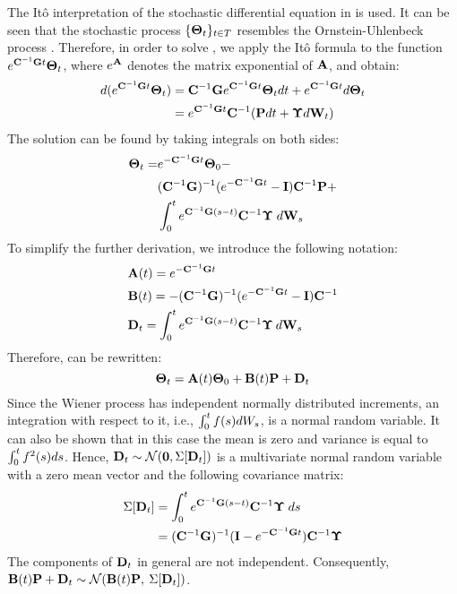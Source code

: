 The It\^{o} interpretation \cite{oksendal2003} of the stochastic differential equation in  is used. It can be seen that the stochastic process $\{ \mathbf{\Theta}_t \}_{t \in T}$ resembles the Ornstein-Uhlenbeck process \cite{kloeden1992}. Therefore, in order to solve , we apply the It\^{o} formula \cite{oksendal2003} to the function $e^{ \mathbf{C}^{-1} \mathbf{G} t} \mathbf{\Theta}_t$, where $e^{\mathbf{A}}$ denotes the matrix exponential of $\mathbf{A}$, and obtain:
\begin{align*}
  d(e^{\mathbf{C}^{-1} \mathbf{G} t} \mathbf{\Theta}_t) & = \mathbf{C}^{-1} \mathbf{G} e^{\mathbf{C}^{-1} \mathbf{G} t} \mathbf{\Theta}_t dt + e^{\mathbf{C}^{-1} \mathbf{G} t} d\mathbf{\Theta}_t \\
  & = e^{\mathbf{C}^{-1} \mathbf{G} t} \mathbf{C}^{-1} (\mathbf{P} dt + \mathbf{\Upsilon} d\mathbf{W}_t)
\end{align*}
The solution can be found by taking integrals on both sides:
\begin{align} \equlabel{solution-full}
  \vtemperature_\time = & \emcgt \vtemperature_0 - \\
    & (\cg)^{-1}(\emcgt - \mone) \mcapacitance^{-1} \vpower + \nonumber \\
    & \int_0^\time \ecg{}{(s - \time)} \mcapacitance^{-1} \mnoisedeviation \; d\m{W}_s \nonumber
\end{align}
To simplify the further derivation, we introduce the following notation:
\begin{align}
  & \m{A}(\time) = \emcg{\time} \equlabel{a} \\
  & \m{B}(\time) = -(\cg)^{-1}(\emcg{\time} - \mone) \mcapacitance^{-1} \equlabel{b} \\
  & \v{D}_\time = \int_0^{\time} \ecg{}{(s - \time)} \mcapacitance^{-1} \mnoisedeviation \: d\m{W}_s \equlabel{d}
\end{align}
Therefore,  can be rewritten:
\[
  \mathbf{\Theta}_t = \mathbf{A}(t) \mathbf{\Theta}_0 + \mathbf{B}(t) \mathbf{P} + \mathbf{D}_t
\]
Since the Wiener process has independent normally distributed increments, an integration with respect to it, i.e., $\int_0^t f(s) dW_s$, is a normal random variable. It can also be shown that in this case the mean is zero and variance is equal to $\int_0^t f^2(s) ds$. Hence, $\mathbf{D}_t \sim \mathcal{N}(\mathbf{0}, \Sigma[\mathbf{D}_t])$ is a multivariate normal random variable with a zero mean vector and the following covariance matrix:
\begin{align}
  \covariance{\v{D}_\time} & = \int_0^\time \ecg{}{(s - \time)} \mcapacitance^{-1} \mnoisedeviation \; ds \nonumber \\
    & = (\cg)^{-1} (\mone - \emcgt) \mcapacitance^{-1} \mnoisedeviation \equlabel{covariance-d}
\end{align}
The components of $\mathbf{D}_t$ in general are not independent. Consequently, $\mathbf{B}(t) \mathbf{P} + \mathbf{D}_t \sim \mathcal{N}(\mathbf{B}(t) \mathbf{P}, \: \Sigma[\mathbf{D}_t])$.

